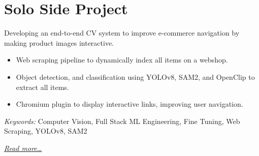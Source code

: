 \section{Solo Side Project}
Developing an end-to-end CV system to improve e-commerce navigation by making product images interactive.

\begin{itemize}
  \item Web scraping pipeline to dynamically index all items on a webshop.
  \item Object detection, and classification using YOLOv8, SAM2, and OpenClip to extract all items.
  \item Chromium plugin to display interactive links, improving user navigation.
\end{itemize}

\small{\textit{Keywords:} Computer Vision, Full Stack ML Engineering, Fine Tuning, Web Scraping, YOLOv8, SAM2}

\hfill{\small{\textit{\hyperref[sec:iris]{Read more…}}}}

